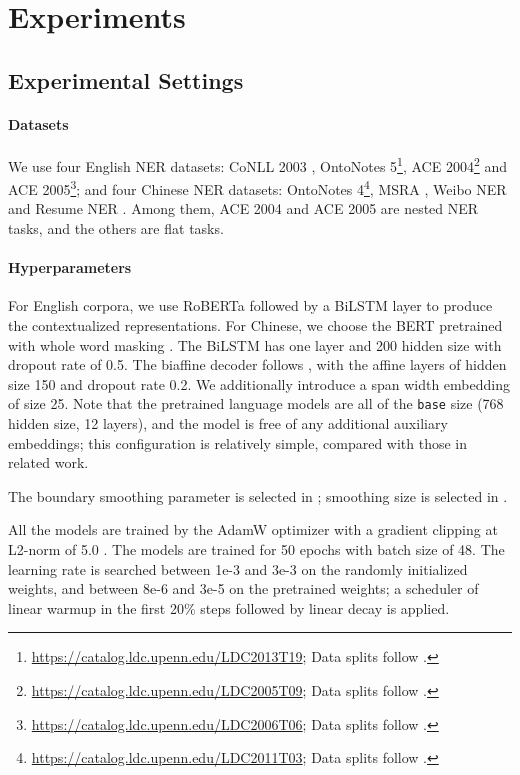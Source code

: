 \documentclass[11pt]{article}
\begin{document}
\section{Experiments} \label{sec:experiments}
\subsection{Experimental Settings}
\paragraph{Datasets} We use four English NER datasets: CoNLL 2003 \citep{tjong-kim-sang-veenstra-1999-representing}, OntoNotes 5\footnote{\url{https://catalog.ldc.upenn.edu/LDC2013T19}; Data splits follow \citet{pradhan-etal-2013-towards}.}, ACE 2004\footnote{\url{https://catalog.ldc.upenn.edu/LDC2005T09}; Data splits follow \citet{lu-roth-2015-joint}.} and ACE 2005\footnote{\url{https://catalog.ldc.upenn.edu/LDC2006T06}; Data splits follow \citet{lu-roth-2015-joint}.}; and four Chinese NER datasets: OntoNotes 4\footnote{\url{https://catalog.ldc.upenn.edu/LDC2011T03}; Data splits follow \citet{che-etal-2013-named}.}, MSRA \citep{levow-2006-third}, Weibo NER \citep{peng-dredze-2015-named} and Resume NER \citep{zhang-yang-2018-chinese}. Among them, ACE 2004 and ACE 2005 are nested NER tasks, and the others are flat tasks. 

\paragraph{Hyperparameters} For English corpora, we use RoBERTa \citep{liu2019roberta} followed by a BiLSTM layer to produce the contextualized representations. For Chinese, we choose the BERT pretrained with whole word masking \citep{cui2019pretraining}. The BiLSTM has one layer and 200 hidden size with dropout rate of 0.5. The biaffine decoder follows \citet{yu-etal-2020-named}, with the affine layers of hidden size 150 and dropout rate 0.2. We additionally introduce a span width embedding of size 25. Note that the pretrained language models are all of the \texttt{base} size (768 hidden size, 12 layers), and the model is free of any additional auxiliary embeddings; this configuration is relatively simple, compared with those in related work. 

The boundary smoothing parameter  is selected in ; smoothing size  is selected in . 

All the models are trained by the AdamW optimizer \citep{loshchilov2018decoupled} with a gradient clipping at L2-norm of 5.0 \citep{pascanu2013difficulty}. The models are trained for 50 epochs with batch size of 48. The learning rate is searched between 1e-3 and 3e-3 on the randomly initialized weights, and between 8e-6 and 3e-5 on the pretrained weights; a scheduler of linear warmup in the first 20\% steps followed by linear decay is applied. 
\end{document}
